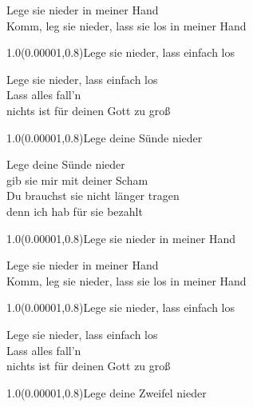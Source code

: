 \documentclass[aspectratio=169]{beamer}
\begin{document}
\begin{frame}
\centering
\color{white}
\huge{Lege sie nieder in meiner Hand} \\
\huge{Komm, leg sie nieder, lass sie los in meiner Hand} \\

\begin{textblock}{1.0}(0.00001,0.8)\color{gray}\normalsize{Lege sie nieder, lass einfach los}\end{textblock}
\end{frame}

\begin{frame}
\centering
\color{white}
\huge{Lege sie nieder, lass einfach los} \\
\huge{Lass alles fall'n} \\
\huge{nichts ist für deinen Gott zu groß} \\

\begin{textblock}{1.0}(0.00001,0.8)\color{gray}\normalsize{Lege deine Sünde nieder}\end{textblock}
\end{frame}

\begin{frame}
\centering
\color{white}
\huge{Lege deine Sünde nieder} \\
\huge{gib sie mir mit deiner Scham} \\
\huge{Du brauchst sie nicht länger tragen} \\
\huge{denn ich hab für sie bezahlt} \\

\begin{textblock}{1.0}(0.00001,0.8)\color{gray}\normalsize{Lege sie nieder in meiner Hand}\end{textblock}
\end{frame}

\begin{frame}
\centering
\color{white}
\huge{Lege sie nieder in meiner Hand} \\
\huge{Komm, leg sie nieder, lass sie los in meiner Hand} \\

\begin{textblock}{1.0}(0.00001,0.8)\color{gray}\normalsize{Lege sie nieder, lass einfach los}\end{textblock}
\end{frame}

\begin{frame}
\centering
\color{white}
\huge{Lege sie nieder, lass einfach los} \\
\huge{Lass alles fall'n} \\
\huge{nichts ist für deinen Gott zu groß} \\

\begin{textblock}{1.0}(0.00001,0.8)\color{gray}\normalsize{Lege deine Zweifel nieder}\end{textblock}
\end{frame}
\end{document}
